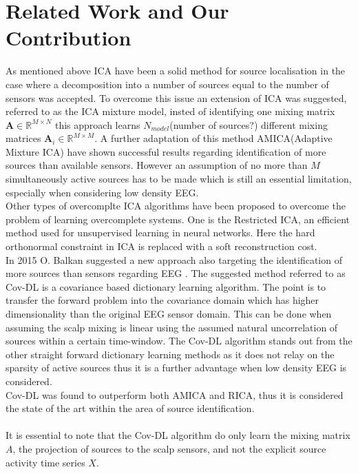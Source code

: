 \section{Related Work and Our Contribution} 
As mentioned above ICA have been a solid method for source localisation in the case where a decomposition into a number of sources equal to the number of sensors was accepted. To overcome this issue an extension of ICA was suggested, referred to as the ICA mixture model, insted of identifying one mixing matrix $\mathbf{A}\in \mathbb{R}^{M\times N}$ this approach learns $N_{model}$(number of sources?) different mixing matrices $\mathbf{A}_i\in \mathbb{R}^{M\times M}$. A further adaptation of this method AMICA(Adaptive Mixture ICA) have shown successful results regarding identification of more sources than available sensors\cite{Palmer2008}. However an assumption of no more than $M$ simultaneously active sources has to be made which is still an essential limitation, especially when considering low density EEG. \\
Other types of overcomplte ICA algorithms have been proposed to overcome the problem of learning overcomplete systems. One is the Restricted ICA, an efficient method used for unsupervised learning in neural networks\cite{Le2011}. Here the hard orthonormal constraint in ICA is replaced with a soft reconstruction cost.\\
In 2015 O. Balkan suggested a new approach also targeting the identification of more sources than sensors regarding EEG \cite{Balkan2015}. The suggested method referred to as Cov-DL is a covariance based dictionary learning algorithm. The point is to transfer the forward problem into the covariance domain which has higher dimensionality than the original EEG sensor domain. This can be done when assuming the scalp mixing is linear   using the assumed natural uncorrelation of sources within a certain time-window. The Cov-DL algorithm stands out from the other straight forward dictionary learning methods as it does not relay on the sparsity of active sources thus it is a further advantage when low density EEG is considered. \\
Cov-DL was found to outperform both AMICA and RICA, thus it is considered the state of the art within the area of source identification. \\ \\
It is essential to note that the Cov-DL algorithm do only learn the mixing matrix $A$, the projection of sources to the scalp sensors, and not the explicit source activity time series $X$.\\
